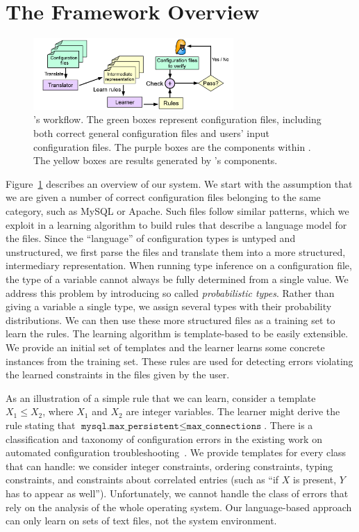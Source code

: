
\section{The \app Framework Overview}

\begin{figure}[tbp] \centering
\includegraphics[width=0.68\textwidth]{figs/overview}
\caption{\app's workflow. The green boxes represent configuration files,
  including both correct general configuration files and users' input
  configuration files. The purple boxes are the components within \app.
  The yellow boxes are results generated by \app's components.}
\label{fig-overview}
\end{figure}

Figure~\ref{fig-overview} describes an overview of our system. We start
with the assumption that we are given a number of correct configuration
files belonging to the same category, such as MySQL or Apache. 
Such files follow similar patterns, which we exploit
in a learning algorithm to build rules that
describe a language model for the files. Since the
``language'' of configuration types is untyped and unstructured, we
first parse the files and translate them into a more structured,
intermediary representation.
When running type inference on a configuration file, 
the type of a variable cannot always be fully determined from 
a single value.
We address this problem 
by introducing so called {\emph{probabilistic types}}.
Rather than giving a variable a single type, we assign several types with their probability distributions. 
We can then use these more structured files
as a training set to learn the rules. The learning algorithm
is template-based to be easily extensible. We provide an initial set of templates and the
learner learns some concrete instances from the training set. These
rules are used for detecting errors violating the learned constraints
in the files given by the user.

As an 
illustration of a simple rule that we can learn, consider a template
 $X_1 \le X_2$, where $X_1$ and $X_2$ are
integer variables. The learner might derive the rule stating that
$\texttt{mysql.max\_persistent} \le \texttt{max\_connections}$. There is a classification and taxonomy of configuration errors in the 
existing work on automated configuration troubleshooting~\cite{yin11anempirical, configdataset}. We provide templates for every class that \app can handle: we consider integer constraints, ordering
constraints, typing constraints, and constraints about correlated entries (such as ``if $X$ is present, $Y$ has to appear as well''). 
Unfortunately, we cannot handle the class of errors that rely on the analysis of the whole operating system.
Our language-based approach can only learn on sets of text files, not the system environment.



